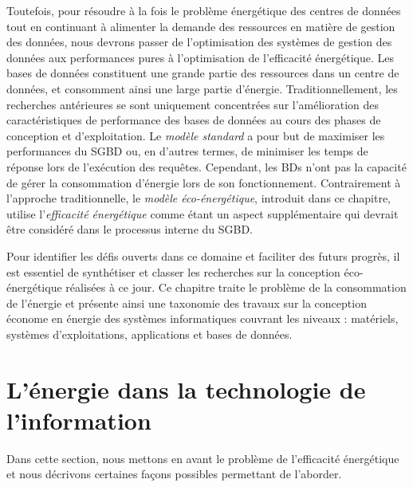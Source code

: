 Toutefois, pour résoudre à la fois le problème énergétique des centres de données tout en continuant à alimenter la demande des ressources en matière de gestion des données, nous devrons passer de l'optimisation des systèmes de gestion des données aux performances pures à l'optimisation de l'efficacité énergétique.
Les bases de données constituent une grande partie des ressources dans un centre de données, et consomment ainsi une large partie d'énergie. Traditionnellement, les recherches antérieures se sont uniquement concentrées sur l'amélioration des caractéristiques de performance des bases de données au cours des phases de conception et d’exploitation. Le \textit{modèle standard} a pour but de maximiser les performances du SGBD ou, en d'autres termes, de minimiser les temps de réponse lors de l'exécution des requêtes. Cependant, les BDs n'ont pas la capacité de gérer la consommation d'énergie lors de son fonctionnement. Contrairement à l'approche traditionnelle, le \textit{modèle éco-énergétique}, introduit dans ce chapitre, utilise l'\textit{efficacité énergétique} comme étant un aspect supplémentaire qui devrait être considéré dans le processus interne du SGBD.

Pour identifier les défis ouverts dans ce domaine et faciliter des futurs progrès, il est essentiel de synthétiser et classer les recherches sur la conception éco-énergétique réalisées à ce jour. Ce chapitre traite le problème de la consommation de l'énergie et présente ainsi une taxonomie des travaux sur la conception économe en énergie des systèmes informatiques couvrant les niveaux : matériels, systèmes d'exploitations, applications et bases de données.


\section{L'énergie dans la technologie de l'information}
Dans cette section, nous mettons en avant le problème de l'efficacité énergétique et nous décrivons certaines façons possibles permettant de l'aborder.

